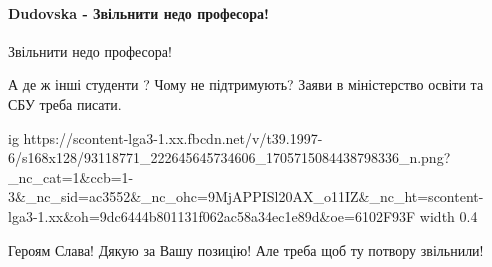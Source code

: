  
 
 
 
 
\paragraph{Dudovska - Звільнити недо професора!}
\label{sec:25_01_2021.fb.proshkovskaja_maria.1.bilchenko_zajavlenie_studentka_magistratura.cmt.dubovska_uvolit_professora}

 
Звільнити недо професора!

 
А де ж інші студенти ? Чому не підтримують? Заяви в міністерство освіти та СБУ треба писати.

 

\ifcmt
  ig https://scontent-lga3-1.xx.fbcdn.net/v/t39.1997-6/s168x128/93118771_222645645734606_1705715084438798336_n.png?_nc_cat=1&ccb=1-3&_nc_sid=ac3552&_nc_ohc=9MjAPPISl20AX_o11IZ&_nc_ht=scontent-lga3-1.xx&oh=9dc6444b801131f062ac58a34ec1e89d&oe=6102F93F
  width 0.4
\fi

 
Героям Слава!
Дякую за Вашу позицію!
Але треба щоб ту потвору звільнили!

